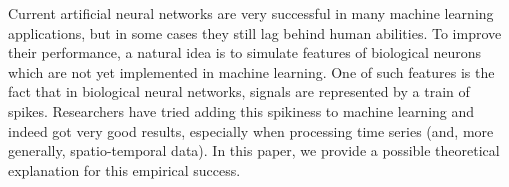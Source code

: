 
Current artificial neural networks are very successful in many
machine learning applications, but in some cases they still lag
behind human abilities. To improve their performance, a natural
idea is to simulate features of biological neurons which are not
yet implemented in machine learning. One of such features is the
fact that in biological neural networks, signals are represented by
a train of spikes. Researchers have tried adding this spikiness to
machine learning and indeed got very good results, especially when
processing time series (and, more generally, spatio-temporal data).
In this paper, we provide a possible theoretical explanation for this
empirical success.


